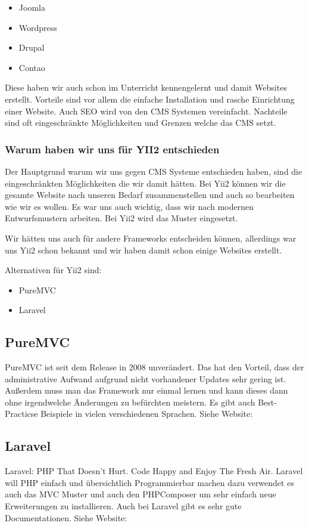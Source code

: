 \begin{itemize}
\item Joomla
\item Wordpress
\item Drupal
\item Contao
\end{itemize}

Diese haben wir auch schon im Unterricht kennengelernt und damit Websites erstellt. Vorteile sind vor allem die einfache Installation und rasche Einrichtung einer Website. Auch SEO wird von den CMS Systemen vereinfacht. Nachteile sind oft eingeschränkte Möglichkeiten und Grenzen welche das CMS setzt.

\subsubsection{Warum haben wir uns für YII2 entschieden}

Der Hauptgrund warum wir uns gegen CMS Systeme entschieden haben, sind die eingeschränkten Möglichkeiten die wir damit hätten. Bei Yii2 können wir die gesamte Website nach unseren Bedarf zusammenstellen und auch so bearbeiten wie wir es wollen. Es war uns auch wichtig, dass wir nach modernen Entwurfsmustern arbeiten. Bei Yii2 wird das  Muster eingesetzt.

Wir hätten uns auch für andere Frameworks entscheiden können, allerdings war uns Yii2 schon bekannt und wir haben damit schon einige Websites erstellt.

Alternativen für Yii2 sind:

\begin{itemize}
	\item PureMVC
	\item Laravel
\end{itemize}

\subsection{PureMVC}
PureMVC ist seit dem Release in 2008 unverändert. Das hat den Vorteil, dass der administrative Aufwand aufgrund nicht vorhandener Updates sehr gering ist. Außerdem muss man das Framework nur einmal lernen und kann dieses dann ohne irgendwelche Änderungen zu befürchten meistern.
Es gibt auch Best-Practicse Beispiele in vielen verschiedenen Sprachen. Siehe Website: \cite{Pure_MVC}

\subsection{Laravel}
Laravel: PHP That Doesn’t Hurt. Code Happy and Enjoy The Fresh Air.
Laravel will PHP einfach und übersichtlich Programmierbar machen dazu verwendet es auch das MVC Muster und auch den PHPComposer um sehr einfach neue Erweiterungen zu installieren. Auch bei Laravel gibt es sehr gute Documentationen. Siehe Website: \cite{laravel}


